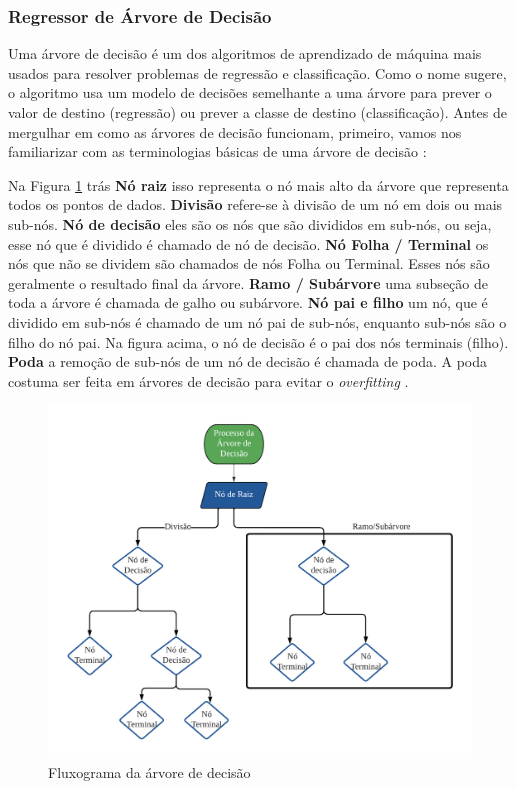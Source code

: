 \subsubsection{Regressor de \'Arvore de Decis\~ao }


Uma árvore de decisão é um dos algoritmos de aprendizado de máquina mais usados para resolver problemas de regressão e classificação. Como o nome sugere, o algoritmo usa um modelo de decisões semelhante a uma árvore para prever o valor de destino (regressão) ou prever a classe de destino (classificação). Antes de mergulhar em como as árvores de decisão funcionam, primeiro, vamos nos familiarizar com as terminologias básicas de uma árvore de decisão \cite{decision}:

Na Figura \ref{fig:decison} trás \textbf{Nó raiz} isso representa o nó mais alto da árvore que representa todos os pontos de dados.
\textbf{Divisão} refere-se à divisão de um nó em dois ou mais sub-nós.
\textbf{Nó de decisão} eles são os nós que são divididos em sub-nós, ou seja, esse nó que é dividido é chamado de nó de decisão.
\textbf{Nó Folha / Terminal} os nós que não se dividem são chamados de nós Folha ou Terminal. Esses nós são geralmente o resultado final da árvore.
\textbf{Ramo / Subárvore} uma subseção de toda a árvore é chamada de galho ou subárvore.
\textbf{Nó pai e filho} um nó, que é dividido em sub-nós é chamado de um nó pai de sub-nós, enquanto sub-nós são o filho do nó pai. Na figura acima, o nó de decisão é o pai dos nós terminais (filho).
\textbf{Poda} a remoção de sub-nós de um nó de decisão é chamada de poda. A poda costuma ser feita em árvores de decisão para evitar o \textit{overfitting}  \cite{decision}.

\begin{figure}[H]
	\centering
	\caption{Fluxograma da árvore de decisão}
	\label{fig:decison}
	\includegraphics[width=\linewidth]{Modelos/Figuras/decison}
	
\end{figure}



